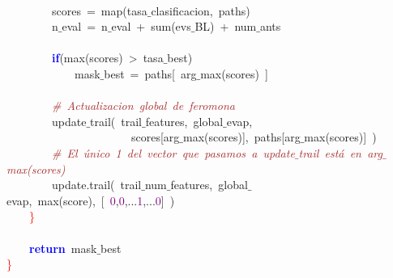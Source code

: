 \mbox{} \\
\mbox{}\ \ \ \ \ \ \ \ scores\ \textcolor{BrickRed}{=}\ map\textcolor{BrickRed}{(}tasa$\_$clasificacion\textcolor{BrickRed}{,}\ paths\textcolor{BrickRed}{)} \\
\mbox{}\ \ \ \ \ \ \ \ n$\_$eval\ \textcolor{BrickRed}{=}\ n$\_$eval\ \textcolor{BrickRed}{+}\ sum\textcolor{BrickRed}{(}evs$\_$BL\textcolor{BrickRed}{)}\ \textcolor{BrickRed}{+}\ num$\_$ants \\
\mbox{} \\
\mbox{}\ \ \ \ \ \ \ \ \textbf{\textcolor{Blue}{if}}\textcolor{BrickRed}{(}max\textcolor{BrickRed}{(}scores\textcolor{BrickRed}{)}\ \textcolor{BrickRed}{\textgreater{}}\ tasa$\_$best\textcolor{BrickRed}{)} \\
\mbox{}\ \ \ \ \ \ \ \ \ \ \ \ mask$\_$best\ \textcolor{BrickRed}{=}\ paths\textcolor{BrickRed}{[}\ arg$\_$max\textcolor{BrickRed}{(}scores\textcolor{BrickRed}{)}\ \textcolor{BrickRed}{]} \\
\mbox{} \\
\mbox{}\ \ \ \ \ \ \ \ \textit{\textcolor{Brown}{\#\ Actualizacion\ global\ de\ feromona}} \\
\mbox{}\ \ \ \ \ \ \ \ update$\_$trail\textcolor{BrickRed}{(}\ trail$\_$features\textcolor{BrickRed}{,}\ global$\_$evap\textcolor{BrickRed}{,} \\
\mbox{}\ \ \ \ \ \ \ \ \ \ \ \ \ \ \ \ \ \ \ \ \ \ scores\textcolor{BrickRed}{[}arg$\_$max\textcolor{BrickRed}{(}scores\textcolor{BrickRed}{)],}\ paths\textcolor{BrickRed}{[}arg$\_$max\textcolor{BrickRed}{(}scores\textcolor{BrickRed}{)]}\ \textcolor{BrickRed}{)} \\
\mbox{}\ \ \ \ \ \ \ \ \textit{\textcolor{Brown}{\#\ El\ único\ 1\ del\ vector\ que\ pasamos\ a\ update$\_$trail\ está\ en\ arg$\_$max(scores)}} \\
\mbox{}\ \ \ \ \ \ \ \ update\textcolor{BrickRed}{.}trail\textcolor{BrickRed}{(}\ trail$\_$num$\_$features\textcolor{BrickRed}{,}\ global$\_$evap\textcolor{BrickRed}{,}\ max\textcolor{BrickRed}{(}score\textcolor{BrickRed}{),}\ \textcolor{BrickRed}{[}\ \textcolor{Purple}{0}\textcolor{BrickRed}{,}\textcolor{Purple}{0}\textcolor{BrickRed}{,...}\textcolor{Purple}{1}\textcolor{BrickRed}{,...}\textcolor{Purple}{0}\textcolor{BrickRed}{]}\ \textcolor{BrickRed}{)} \\
\mbox{}\ \ \ \ \textcolor{Red}{\}} \\
\mbox{} \\
\mbox{}\ \ \ \ \textbf{\textcolor{Blue}{return}}\ mask$\_$best \\
\mbox{}\textcolor{Red}{\}} \\
\mbox{}
